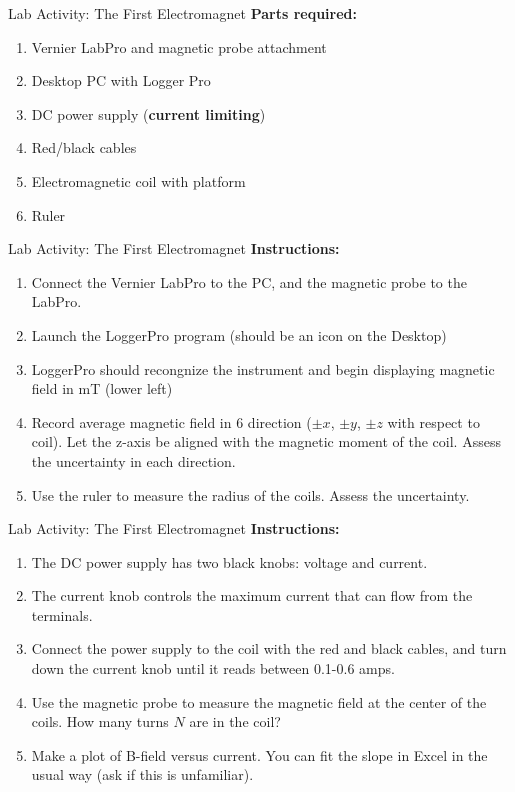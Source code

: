 \documentclass{beamer}
\begin{document}
\begin{frame}{Lab Activity: The First Electromagnet}
\textbf{Parts required:}
\begin{enumerate}
\item Vernier LabPro and magnetic probe attachment
\item Desktop PC with Logger Pro
\item DC power supply (\textbf{current limiting})
\item Red/black cables
\item Electromagnetic coil with platform
\item Ruler
\end{enumerate}
\end{frame}

\begin{frame}{Lab Activity: The First Electromagnet}
\textbf{Instructions:}
\begin{enumerate}
\item Connect the Vernier LabPro to the PC, and the magnetic probe to the LabPro.
\item Launch the LoggerPro program (should be an icon on the Desktop)
\item LoggerPro should recongnize the instrument and begin displaying magnetic field in mT (lower left)
\item Record average magnetic field in 6 direction ($\pm x$, $\pm y$, $\pm z$ with respect to coil).  Let the z-axis be aligned with the magnetic moment of the coil. Assess the uncertainty in each direction.
\item Use the ruler to measure the radius of the coils. Assess the uncertainty.
\end{enumerate}
\end{frame}

\begin{frame}{Lab Activity: The First Electromagnet}
\textbf{Instructions:}
\begin{enumerate}
\item The DC power supply has two black knobs: voltage and current.
\item The current knob controls the maximum current that can flow from the terminals.
\item Connect the power supply to the coil with the red and black cables, and turn down the current knob until it reads between 0.1-0.6 amps.
\item Use the magnetic probe to measure the magnetic field at the center of the coils.  How many turns $N$ are in the coil?
\item Make a plot of B-field versus current.  You can fit the slope in Excel in the usual way (ask if this is unfamiliar).
\end{enumerate}
\end{frame}
\end{document}
